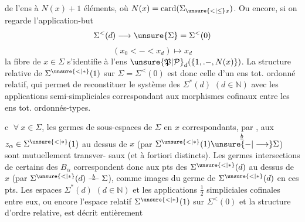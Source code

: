 de l'ens à $N(x)+1$ éléments, où $N(x)=\operatorname{card}(\Sigma_{\unsure{<|\leq}x})$.
Ou encore, si on regarde l'application-but
\[
\Sigma^{<}(d)\longrightarrow\unsure{\Sigma}=\Sigma^{<}(0)
\]
\[
(x_0<-<x_d)\longmapsto x_d
\]
la fibre de $x\in\Sigma$ s'identifie à l'ens 
$\unsure{\mathfrak P|\mathcal P}_d(\{1,.-,N(x)\})$.
La structure relative de $\Sigma^{\unsure{<|*}}(1)$ sur $\Sigma=\Sigma^{<}(0)$
est donc celle d'un ens tot. ordonné relatif, qui
permet de reconstituer le système des $\Sigma^{*}(d)$
 $(d\in\mathbb N)$ avec les applications semi-simpliciales
correspondant aux morphismes cofinaux entre
les ens tot. ordonnés-types.

\textcircled{c} $\forall\ x\in\Sigma$, les germes  de sous-espaces  de $\Sigma$ en $x$
correspondants, par , aux $z_\alpha\in\Sigma^{\unsure{<|*}}(1)$ au dessus
de $x$ (par $\Sigma^{\unsure{<|*}}(1)\overset{\underline b}{\unsure{-|\longrightarrow}}\Sigma$) sont mutuellement transver-
saux (et à fortiori distincts).
Les germes intersections de certains des $B_\alpha$
correspondent donc aux pts des $\Sigma^{\unsure{<|*}}(d)$ au dessus
de $x$ (par $\Sigma^{\unsure{<|*}}(d)\overset{\underline b}{\relbar\joinrel\relbar}\Sigma$), comme
images du  germe de $\Sigma^{\unsure{<|*}}(d)$ en ces pts.
 Les espaces $\Sigma^{*}(d)$ $(d\in\mathbb N)$ et les
applications $\tfrac12$ simpliciales cofinales entre eux, 
ou encore l'espace relatif $\Sigma^{\unsure{<|*}}(1)$ sur $\Sigma^{<}(0)$ et la
structure d'ordre relative, est décrit entièrement

